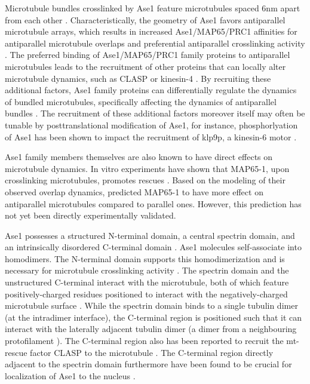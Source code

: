 Microtubule bundles crosslinked by Ase1 feature microtubules spaced 6nm apart from each other . Characteristically, the geometry of Ase1 favors antiparallel microtubule arrays, which results in increased Ase1/MAP65/PRC1 affinities for antiparallel microtubule overlaps and preferential antiparallel crosslinking activity \parencite{She2019,Bieling2010,Janson2007,Subramanian2010,Kellogg2016,Gaillard2008}. The preferred binding of Ase1/MAP65/PRC1 family proteins to antiparallel microtubules leads to the recruitment of other proteins that can locally alter microtubule dynamics, such as CLASP \parencite{Bratman2007b,Liu2009,Kitazawa2014} or kinesin-4 \parencite{Bieling2010, Mani2021}. By recruiting these additional factors, Ase1 family proteins can differentially regulate the dynamics of bundled microtubules, specifically affecting the dynamics of antiparallel bundles \parencite{Bieling2010, Bratman2007b, Thomas2020, Mani2021}. The recruitment of these additional factors moreover itself may often be tunable by posttranslational modification of Ase1, for instance, phosphorlyation of Ase1 has been shown to impact the recruitment of klp9p, a kinesin-6 motor .

Ase1 family members themselves are also known to have direct effects on microtubule dynamics. In vitro experiments have shown that MAP65-1, upon crosslinking microtubules, promotes rescues \parencite{Stoppin-Mellet2013}. Based on the modeling of their observed overlap dynamics, \cite{Stoppin-Mellet2013} predicted MAP65-1 to have more effect on antiparallel microtubules compared to parallel ones. However, this prediction has not yet been directly experimentally validated.\par

Ase1 possesses a structured N-terminal domain, a central spectrin domain, and an intrinsically disordered C-terminal domain \parencite{Kapitein2008,Kellogg2016}. Ase1 molecules self-associate into homodimers. The N-terminal domain supports this homodimerization and is necessary for microtubule crosslinking activity \parencite{Janson2007}. The spectrin domain and the unstructured C-terminal interact with the microtubule, both of which feature positively-charged residues positioned to interact with the negatively-charged microtubule surface \parencite{Kellogg2016}. While the spectrin domain binds to a single tubulin dimer (at the intradimer interface), the C-terminal region is positioned such that it can interact with the laterally adjacent tubulin dimer (a dimer from a neighbouring protofilament )\parencite{Kellogg2016}. The C-terminal region also has been reported to recruit the mt-rescue factor CLASP to the microtubule \cite{Bratman2007b}. The C-terminal region directly adjacent to the spectrin domain furthermore have been found to be crucial for localization of Ase1 to the nucleus .\par 

